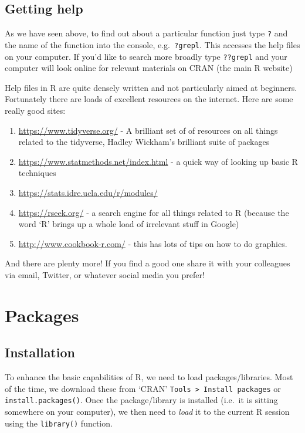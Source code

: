 \documentclass[]{article}
\providecommand{\tightlist}{%
  \setlength{\itemsep}{0pt}\setlength{\parskip}{0pt}}
\begin{document}
\hypertarget{getting-help}{%
\subsection{Getting help}\label{getting-help}}

As we have seen above, to find out about a particular function just type
\texttt{?} and the name of the function into the console,
e.g.~\texttt{?grepl}. This accesses the help files on your computer. If
you'd like to search more broadly type \texttt{??grepl} and your
computer will look online for relevant materials on CRAN (the main R
website)

Help files in R are quite densely written and not particularly aimed at
beginners. Fortunately there are loads of excellent resources on the
internet. Here are some really good sites:

\begin{enumerate}
\def\labelenumi{(\alph{enumi})}
\tightlist
\item
  \url{https://www.tidyverse.org/} - A brilliant set of of resources on
  all things related to the tidyverse, Hadley Wickham's brilliant suite
  of packages
\item
  \url{https://www.statmethods.net/index.html} - a quick way of looking
  up basic R techniques
\item
  \url{https://stats.idre.ucla.edu/r/modules/}
\item
  \url{https://rseek.org/} - a search engine for all things related to R
  (because the word `R' brings up a whole load of irrelevant stuff in
  Google)
\item
  \url{http://www.cookbook-r.com/} - this has lots of tips on how to do
  graphics.
\end{enumerate}

And there are plenty more! If you find a good one share it with your
colleagues via email, Twitter, or whatever social media you prefer!

\hypertarget{packages}{%
\section{Packages}\label{packages}}

\hypertarget{installation}{%
\subsection{Installation}\label{installation}}

To enhance the basic capabilities of R, we need to load
packages/libraries. Most of the time, we download these from `CRAN'
\texttt{Tools\ \textgreater{}\ Install\ packages} or
\texttt{install.packages()}. Once the package/library is installed
(i.e.~it is sitting somewhere on your computer), we then need to
\emph{load} it to the current R session using the \texttt{library()}
function.
\end{document}
